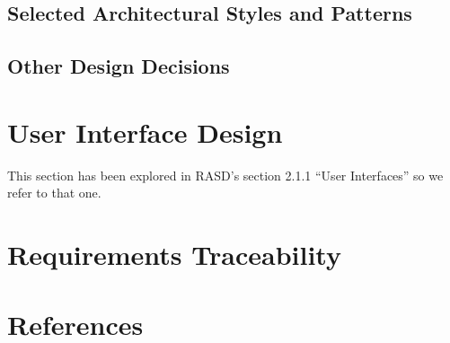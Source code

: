 \documentclass{article}
\begin{document}
\subsection{Selected Architectural Styles and Patterns}
\subsection{Other Design Decisions}


\section{User Interface Design}
This section has been explored in RASD's section 2.1.1 ``User Interfaces'' so we refer to that one.

\section{Requirements Traceability}

\section{References}
\clearpage
\end{document}
